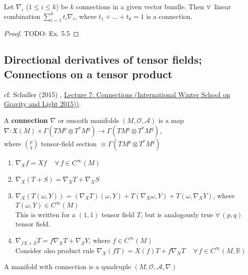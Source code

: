 \begin{proposition}
Let $\nabla_i$ ($1 \leq i \leq k$) be $k$ connections in a given vector bundle. Then $\forall \, $ linear combination $\sum_{i=1}^k t_i \nabla_i$, where $t_1 + \dots + t_k =1$ is a connection.	
\end{proposition} 

\begin{proof}
	TODO: Ex. 5.5
\end{proof} 

\subsection{Directional derivatives of tensor fields; Connections on a tensor product}

cf. Schuller (2015) \cite{dgdt:Schul2015}, \href{https://youtu.be/nEaiZBbCVtI}{Lecture 7: Connections (International Winter School on Gravity and Light 2015))}.

\begin{definition}
	A \textbf{connection} $\nabla$ or smooth manifolds $(M, \mathcal{O}, \mathcal{A})$ is a map $\nabla : \mathfrak{X}(M) \times \Gamma(TM^p \otimes T^*M^q) \to \Gamma(TM^p \otimes T^*M^q)$, \\
	where $\binom{p}{q}$ tensor-field section $\equiv \Gamma (TM^p \otimes T^*M^q)$
	
	\begin{enumerate}
		\item $\nabla_X f = Xf \quad \, \forall \, f \in C^{\infty}(M)$ 
		\item $\nabla_X(T+S) = \nabla_XT  + \nabla_XS$ 
		\item $\nabla_X(T(\omega, Y)) = (\nabla_XT)(\omega, Y) + T(\nabla_X \omega, Y) + T(\omega, \nabla_X Y)$, where $T(\omega, Y) \in C^{\infty}(M)$ \\
		
		This is written for a $(1, 1)$ tensor field $T$, but is analogously true $\forall \, (p, q)$ tensor field. 
		\item $\nabla_{fX + Z} T = f\nabla_X T + \nabla_Z Y$, where $f\in C^{\infty}(M)$ \\
		
		Consider also product rule $\nabla_X(fT) = X(f) T + f\nabla_XT \quad \, \forall \, f \in C^{\infty}(M, \mathbb{R})$
	\end{enumerate}

A manifold with connection is a quadruple $(M, \mathcal{O}, \mathcal{A}, \nabla)$
\end{definition}

